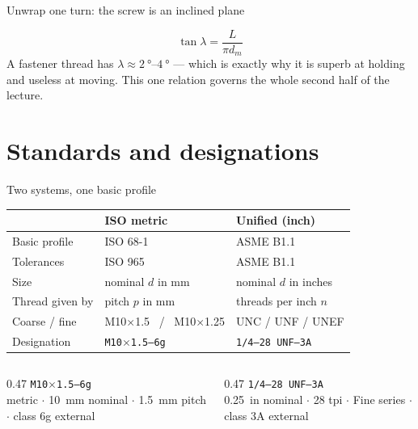 \documentclass[aspectratio=169,10pt]{beamer}
\begin{document}
\begin{frame}{Unwrap one turn: the screw is an inclined plane}
\centering
{}
\vfill
\[\boxed{\ \tan\lambda = \frac{L}{\pi d_m}\ }\]
\vfill
{\small A fastener thread has $\lambda \approx \SIrange{2}{4}{\degree}$ --- which is exactly why it is
superb at holding and useless at moving. This one relation governs the whole second half of the
lecture.}
\end{frame}

\section{Standards and designations}

\begin{frame}{Two systems, one basic profile}
\centering\small
\begin{tabular}{@{}lll@{}}
\toprule
 & \textbf{ISO metric} & \textbf{Unified (inch)}\\
\midrule
Basic profile & ISO 68-1 & ASME B1.1\\
Tolerances & ISO 965 & ASME B1.1\\
Size & nominal $d$ in mm & nominal $d$ in inches\\
Thread given by & pitch $p$ in mm & threads per inch $n$\\
Coarse / fine & M10$\times$1.5 \ / \ M10$\times$1.25 & UNC / UNF / UNEF\\
Designation & \texttt{M10$\times$1.5--6g} & \texttt{1/4--28 UNF--3A}\\
\bottomrule
\end{tabular}
\vfill
\begin{columns}[T]
\begin{column}{0.47\textwidth}
\footnotesize \texttt{M10$\times$1.5--6g}\\
metric $\cdot$ \SI{10}{mm} nominal $\cdot$ \SI{1.5}{mm} pitch $\cdot$ class 6g external
\end{column}
\begin{column}{0.47\textwidth}
\footnotesize \texttt{1/4--28 UNF--3A}\\
\SI{0.25}{in} nominal $\cdot$ 28 tpi $\cdot$ Fine series $\cdot$ class 3A external
\end{column}
\end{columns}
\end{frame}
\end{document}
